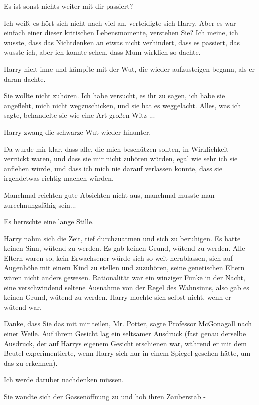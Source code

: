 \glqq{}Es ist sonst nichts weiter mit dir passiert?\grqq{}

\glqq{}Ich weiß, es hört sich nicht nach viel an\grqq{}, verteidigte sich Harry.
\glqq{}Aber es war einfach einer dieser kritischen Lebensmomente, verstehen Sie?
Ich meine, ich wusste, dass das Nichtdenken an etwas nicht verhindert, dass es
passiert, das wusste ich, aber ich konnte sehen, dass Mum wirklich so
dachte.\grqq{}

Harry hielt inne und kämpfte mit der Wut, die wieder aufzusteigen begann, als er
daran dachte.

\glqq{}Sie wollte nicht zuhören. Ich habe versucht, es ihr zu sagen, ich habe
sie angefleht, mich nicht wegzuschicken, und sie hat es weggelacht. Alles, was
ich sagte, behandelte sie wie eine Art großen Witz ...\grqq{}

Harry zwang die schwarze Wut wieder hinunter.

\glqq{}Da wurde mir klar, dass alle, die mich beschützen sollten, in
Wirklichkeit verrückt waren, und dass sie mir nicht zuhören würden, egal wie
sehr ich sie anflehen würde, und dass ich mich nie darauf verlassen konnte, dass
sie irgendetwas richtig machen würden.\grqq{}

Manchmal reichten gute Absichten nicht aus, manchmal musste man zurechnungsfähig
sein...

Es herrschte eine lange Stille.

Harry nahm sich die Zeit, tief durchzuatmen und sich zu beruhigen. Es hatte
keinen Sinn, wütend zu werden. Es gab keinen Grund, wütend zu werden. Alle
Eltern waren so, kein Erwachsener würde sich so weit herablassen, sich auf
Augenhöhe mit einem Kind zu stellen und zuzuhören, seine genetischen Eltern
wären nicht anders gewesen. Rationalität war ein winziger Funke in der Nacht,
eine verschwindend seltene Ausnahme von der Regel des Wahnsinns, also gab es
keinen Grund, wütend zu werden. Harry mochte sich selbst nicht, wenn er wütend
war.

\glqq{}Danke, dass Sie das mit mir teilen, Mr. Potter\grqq{}, sagte Professor
McGonagall nach einer Weile. Auf ihrem Gesicht lag ein seltsamer Ausdruck (fast
genau derselbe Ausdruck, der auf Harrys eigenem Gesicht erschienen war, während
er mit dem Beutel experimentierte, wenn Harry sich nur in einem Spiegel gesehen
hätte, um das zu erkennen).

\glqq{}Ich werde darüber nachdenken müssen.\grqq{}

Sie wandte sich der Gassenöffnung zu und hob ihren Zauberstab -

